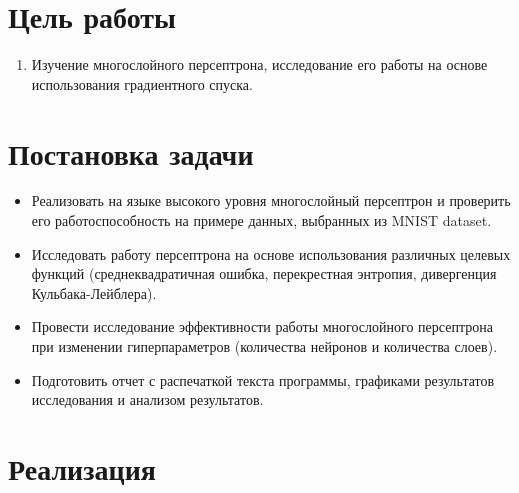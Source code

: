 \documentclass[a4paper, 14pt]{extarticle}
\begin{document}
\renewcommand{\ttdefault}{pcr}

\setlength{\tabcolsep}{3pt}
\newpage
\setcounter{page}{2}

\section{Цель работы}

\begin{enumerate}
  \item Изучение многослойного персептрона, исследование его работы на основе использования градиентного спуска.
\end{enumerate}

\section{Постановка задачи}

\begin{itemize}
  \item Реализовать на языке высокого уровня многослойный персептрон и проверить его работоспособность на примере данных, выбранных из MNIST dataset. 
  \item Исследовать работу персептрона на основе использования различных целевых функций (среднеквадратичная ошибка, перекрестная энтропия, дивергенция
    Кульбака-Лейблера).
  \item Провести исследование эффективности работы многослойного персептрона при изменении гиперпараметров (количества нейронов и количества слоев).
  \item Подготовить отчет с распечаткой текста программы, графиками результатов исследования и анализом результатов.
\end{itemize}

\section{Реализация}
\end{document}
